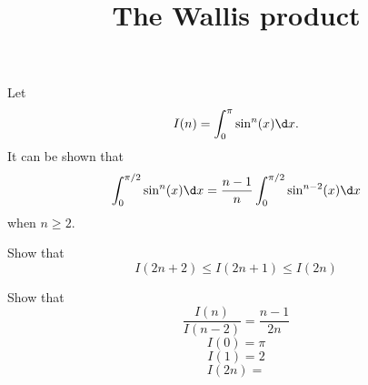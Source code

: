 \documentclass{ximera}
\title[Dig-In:]{The Wallis product}
\begin{document}
\begin{abstract}
\end{abstract}
\maketitle

Let
\[
I(n) = \int_0^\pi \sin^n(x) \d x.
\]
It can be shown that
\[
\int_0^{\pi/2} \sin^n(x)\d x = \frac{n-1}{n} \int_0^{\pi/2} \sin^{n-2}(x) \d x
\]
when $n\ge 2$.

Show that
\[
I(2n+2) \le I(2n+1) \le I(2n)
\]

Show that
\[
\frac{I(n)}{I(n-2)} = \frac{n-1}{2n}
\]
\[
I(0) = \pi
\]
\[
I(1) = 2
\]
\[
I(2n) = 
\]
\end{document}
